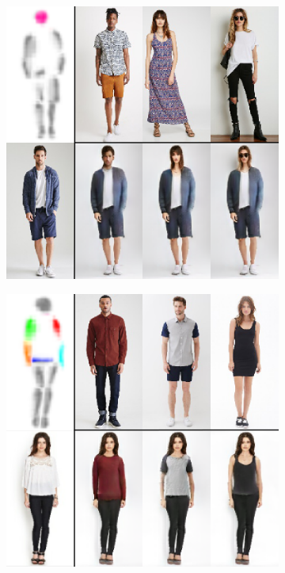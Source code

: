 \begin{figure}[t]
	\begin{subfigure}{0.49\linewidth}
	\centering
	\includegraphics[trim={0cm 0cm 0cm 0cm},clip, width=1.\linewidth]{fig/part_head}\caption{}
	\label{fig:part3_00}
	\end{subfigure}
	\begin{subfigure}{0.49\linewidth}
	\centering
	\includegraphics[trim={0cm 0cm 0cm 0cm},clip, width=1.\linewidth]{fig/part_body}\caption{}

\end{subfigure}
\end{figure}
